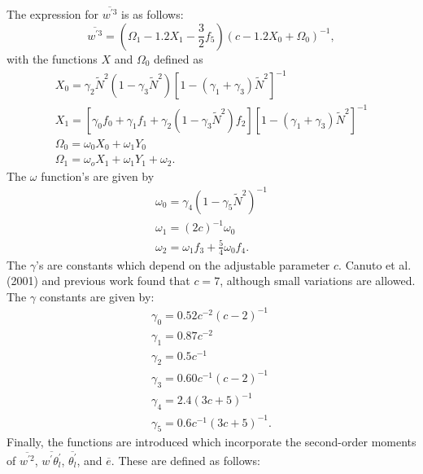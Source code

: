 \documentclass[12pt,titlepage]{article}
\numberwithin{equation}{section}
\begin{document}
The expression for $\overline{w^{'3}}$ is as follows:
%
\begin{equation}
\overline{w^{'3}}=\left(\Omega_{1}-1.2X_{1}-\frac{3}{2}f_{5}\right)\left(c-1.2X_{0}+\Omega_{0}\right)^{-1},
  \label{w3_z}
\end{equation}
%
with the functions $X$ and $\Omega_{0}$ defined as
%
\begin{equation}
  \label{Xomega_func}
  \begin{split}
    X_{0}=\gamma_{2}\tilde{N}^{2}\left(1-\gamma_{3}\tilde{N}^{2}\right)\left[1-\left(\gamma_{1}+\gamma_{3}\right)\tilde{N}^{2}\right]^{-1}\\
    X_{1}=\left[\gamma_{0}f_{0}+\gamma_{1}f_{1}+\gamma_{2}\left(1-\gamma_{3}\tilde{N}^{2}\right)f_{2}\right]\left[1-\left(\gamma_{1}+\gamma_{3}\right)\tilde{N}^{2}\right]^{-1}\\
    \Omega_{0}=\omega_{0}X_{0}+\omega_{1}Y_{0}\\
    \Omega_{1}=\omega_{o}X_{1}+\omega_{1}Y_{1}+\omega_{2}.
  \end{split}
\end{equation}
%
The $\omega$ function's are given by
%
\begin{equation}
  \label{omegas}
  \begin{split}
  \omega_{0}=\gamma_{4}\left(1-\gamma_{5}\tilde{N}^{2}\right)^{-1}\\
  \omega_{1}=\left(2c\right)^{-1}\omega_{0}\\
  \omega_{2}=\omega_{1}f_{3}+\frac{5}{4}\omega_{0}f_{4}.
  \end{split}
\end{equation}
%
The $\gamma$'s are constants which depend on the adjustable parameter $c$.  Canuto et al. (2001) and previous work found that $c=7$, although small variations are allowed.  The $\gamma$ constants are given by:
%
\begin{equation}
  \label{gammas}
  \begin{split}
  \gamma_{0}=0.52c^{-2}\left(c-2\right)^{-1}\\
  \gamma_{1}=0.87c^{-2}\\
  \gamma_{2}=0.5c^{-1}\\
  \gamma_{3}=0.60c^{-1}\left(c-2\right)^{-1}\\
  \gamma_{4}=2.4\left(3c+5\right)^{-1}\\
  \gamma_{5}=0.6c^{-1}\left(3c+5\right)^{-1}.
  \end{split}
\end{equation}
%
Finally, the functions are introduced which incorporate the second-order moments of $\overline{w^{'2}}$, $\overline{w^{'}\theta_{l}^{'}}$, $\overline{\theta_{l}^{'}}$, and $\overline{e}$.  These are defined as follows:
\end{document}

